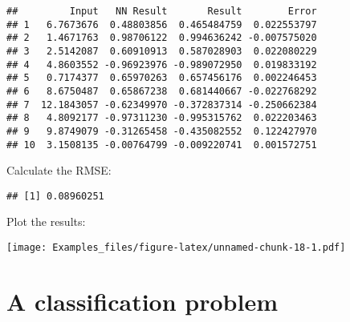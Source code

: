 \documentclass[]{article}
\newenvironment{Shaded}{\begin{snugshade}}{\end{snugshade}}
\newcommand{\DataTypeTok}[1]{\textcolor[rgb]{0.13,0.29,0.53}{#1}}
\newcommand{\DecValTok}[1]{\textcolor[rgb]{0.00,0.00,0.81}{#1}}
\newcommand{\FloatTok}[1]{\textcolor[rgb]{0.00,0.00,0.81}{#1}}
\newcommand{\KeywordTok}[1]{\textcolor[rgb]{0.13,0.29,0.53}{\textbf{#1}}}
\newcommand{\NormalTok}[1]{#1}
\newcommand{\OperatorTok}[1]{\textcolor[rgb]{0.81,0.36,0.00}{\textbf{#1}}}
\newcommand{\StringTok}[1]{\textcolor[rgb]{0.31,0.60,0.02}{#1}}
\begin{document}
\begin{verbatim}
##         Input   NN Result       Result        Error
## 1   6.7673676  0.48803856  0.465484759  0.022553797
## 2   1.4671763  0.98706122  0.994636242 -0.007575020
## 3   2.5142087  0.60910913  0.587028903  0.022080229
## 4   4.8603552 -0.96923976 -0.989072950  0.019833192
## 5   0.7174377  0.65970263  0.657456176  0.002246453
## 6   8.6750487  0.65867238  0.681440667 -0.022768292
## 7  12.1843057 -0.62349970 -0.372837314 -0.250662384
## 8   4.8092177 -0.97311230 -0.995315762  0.022203463
## 9   9.8749079 -0.31265458 -0.435082552  0.122427970
## 10  3.1508135 -0.00764799 -0.009220741  0.001572751
\end{verbatim}

Calculate the RMSE:

\begin{Shaded}
\end{Shaded}

\begin{verbatim}
## [1] 0.08960251
\end{verbatim}

Plot the results:

\begin{Shaded}
\end{Shaded}

\texttt{[image: Examples\_files/figure-latex/unnamed-chunk-18-1.pdf]}

\hypertarget{a-classification-problem}{%
\section{A classification problem}\label{a-classification-problem}}
\end{document}
